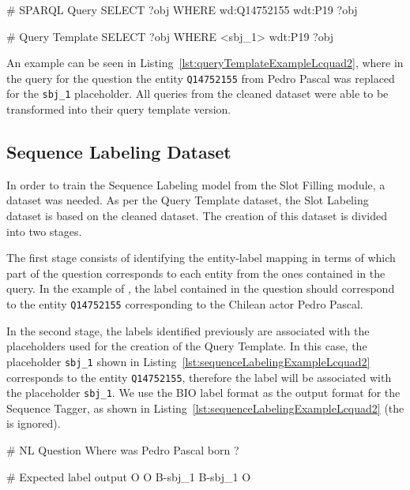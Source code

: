 \begin{sparqlcode}[%
    caption={\SPARQL{} query and its Query Template version.}, 
    label={lst:queryTemplateExampleLcquad2}]
# SPARQL Query
SELECT ?obj WHERE { wd:Q14752155 wdt:P19 ?obj }

# Query Template
SELECT ?obj WHERE { <sbj_1> wdt:P19 ?obj }
\end{sparqlcode}

An example can be seen in Listing~\ref{lst:queryTemplateExampleLcquad2}, where in the \SPARQL{} 
query for the question  the entity \texttt{Q14752155} 
from Pedro Pascal was replaced for the \texttt{sbj\_1} placeholder. All queries from the cleaned dataset 
were able to be transformed into their query template version.

\subsection{Sequence Labeling Dataset}
\label{cap4:experimentalDesign/QaDataset/seqLabeling}
In order to train the Sequence Labeling model from the Slot Filling module, a dataset was 
needed. As per the Query Template dataset, the Slot Labeling dataset is based on the cleaned 
\LCQuADtwo{} dataset. The creation of this dataset is divided into two stages. 

The first stage consists of identifying the entity-label mapping in terms of which part of the 
question corresponds to each entity from the ones contained in the \SPARQL{} query. In the example 
of , the label  contained in the 
question should correspond to the entity \texttt{Q14752155} corresponding to the Chilean actor Pedro 
Pascal. 

In the second stage, the labels identified previously are associated with the placeholders used 
for the creation of the Query Template. In this case, the placeholder \texttt{sbj\_1} shown in 
Listing~\ref{lst:sequenceLabelingExampleLcquad2} corresponds to the entity \texttt{Q14752155}, 
therefore the label  will be associated with the placeholder \texttt{sbj\_1}. 
We use the BIO label format as the output format for the Sequence Tagger, as shown in 
Listing~\ref{lst:sequenceLabelingExampleLcquad2} (the  is ignored).

\begin{sparqlcode}[%
    caption={BIO label representation for a Natural Language Question.}, 
    label={lst:sequenceLabelingExampleLcquad2}]
# NL Question
Where was Pedro Pascal born ?

# Expected label output
O O B-sbj_1 B-sbj_1 O
\end{sparqlcode}

